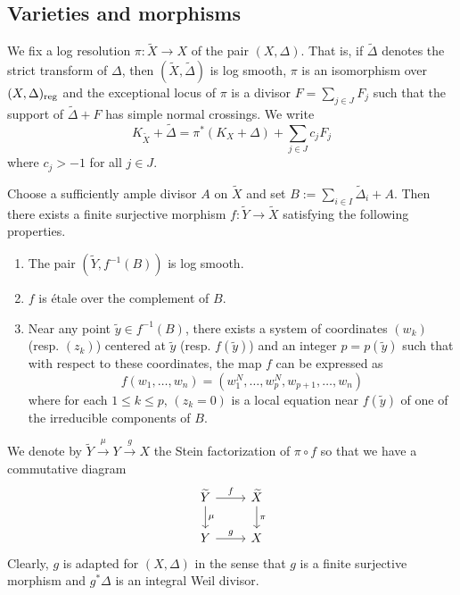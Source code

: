 \documentclass[12pt]{amsart}
\theoremstyle{definition}
\newcommand{\tX}{\widetilde{X}}
\newcommand{\tY}{\widetilde{Y}}
\numberwithin{equation}{section}
\newcommand{\tDe}{\widetilde \Delta}
\begin{document}
\subsection{Varieties and morphisms}
We fix a log resolution $\pi:\tX\to X$ of the pair $(X,\Delta)$. That is, if $\tDe$ denotes the strict transform of $\Delta$, then $(\tX, \tDe)$ is log smooth, $\pi$ is an isomorphism over $(X,\Delta)_{\rm reg}$ and the exceptional locus of $\pi$ is a divisor $F=\sum_{j\in J} F_j$ such that the support of $\tDe+F$ has simple normal crossings. We write 
\begin{equation}
\label{disc}
K_{\tX}+\tDe=\pi^*(K_X+\Delta)+\sum_{j\in J} c_j F_j
\end{equation}
where $c_j>-1$ for all $j\in J$. 

Choose a sufficiently ample divisor $A$ on $\tX$ and set $B:=\sum_{i\in I} \tDe_i+A$. Then there exists a finite surjective morphism $f:\tY\to \tX$ satisfying the following properties. 
\begin{enumerate}
\item  The pair $(\tY, f^{-1}(B))$ is log smooth.  
\item $f$ is étale over the complement of $B$.
\item Near any point $\tilde y \in f^{-1}(B)$,  there exists a system of coordinates $(w_k)$ (resp. $(z_k)$) centered at $\tilde y$ (resp. $f(\tilde y)$) and an integer $p=p(\tilde y)$ such that with respect to these coordinates, the map $f$ can be expressed as
\[f(w_1, \ldots, w_n)=(w_1^N, \ldots, w_p^N, w_{p+1}, \ldots, w_n)\]
where for each $1\le k \le p$, $(z_k=0)$ is a local equation near $f(\tilde y)$ of one of the irreducible components of $B$. 
\end{enumerate}
We denote by $\tY\overset{\mu}{\to} Y\overset{g}{\to} X$ the Stein factorization of $\pi \circ f$ so that we have a commutative diagram
\[
\begin{tikzcd}
\tY \arrow[r, "f"] \arrow[d, "\mu"] & \tX \arrow[d, "\pi"]\\
Y \arrow[r, "g"] & X
\end{tikzcd}
\] 
Clearly, $g$ is adapted for $(X,\Delta)$ in the sense that $g$ is a finite surjective morphism and $g^*\Delta$ is an integral Weil divisor.
\end{document}
